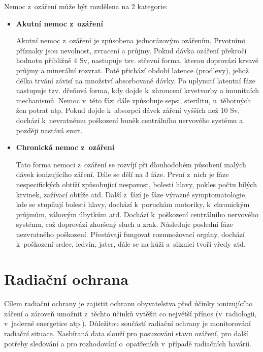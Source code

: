 Nemoc z~ozáření může být rozdělena na 2 kategorie: \cite{nemoc}

\begin{itemize}
	\item \textbf{Akutní nemoc z~ozáření}
	
		Akutní nemoc z~ozáření je způsobena jednorázovým
ozářením. Prvotními pří\-znaky jsou nevolnost, zvracení a průjmy. Pokud
dávka ozáření překročí hodnotu přibližně 4 Sv, nastupuje tzv. střevní
forma, kterou doprovází krvavé průjmy a mine\-rální rozvrat. Poté
přichází období latence (prodlevy), jehož délka trvání závisí na
množství absorbované dávky. Po uplynutí latentní fáze nastupuje
tzv. dřeňová forma, kdy dojde k~zhroucení krvetvorby a imunitních
mechanismů. Nemoc v~této fázi dále způsobuje sepsi, sterilitu,
u~těhotných žen potrat atp. Pokud dojde k~absorpci dávek záření
vyšších než 10 Sv, dochází k~nevratnému poškození buněk centrálního
nervového systému a později nastává smrt.
		
	\item \textbf{Chronická nemoc z~ozáření}
	
		Tato forma nemoci z~ozáření se rozvíjí při dlouhodobém
působení malých dávek ionizujícího záření. Dále se dělí na 3
fáze. První z~nich je fáze nespecifických obtíží způsobující
nespavost, bolesti hlavy, pokles počtu bílých krvinek, zažívací obtíže
atd. Další z~fází je fáze výrazné symptomatologie, kde se stupňují
bolesti hlavy, dochází k~poruchám motoriky, k~chronickým průjmům,
váhovým úbytkům atd. Dochází k~poškození centrálního nervového
systému, což doprovází zhoršený sluch a zrak. Následuje poslední fáze
nezvratného poškození. Přestávají fungovat rozmnožovací orgány,
dochází k~poškození srdce, ledvin, jater, dále se na kůži a~sliznici
tvoří vředy atd.

\end{itemize}

\section{Radiační ochrana} Cílem radiační ochrany je zajistit ochranu
obyvatelstva před účinky ionizujícího záření a zároveň umožnit
z~těchto účinků vytěžit co největší přínos (v~radiologii, v~jaderné
energetice atp.). Důležitou součástí radiační ochrany je monitorování
radiační situace. Nasbíraná data slouží pro posuzování stavu ozáření,
pro další potřeby sledování a pro rozhodování o~opatřeních v~případě
radiačních havárií. \cite{suroRadOch} \cite{sujbRadSit}

